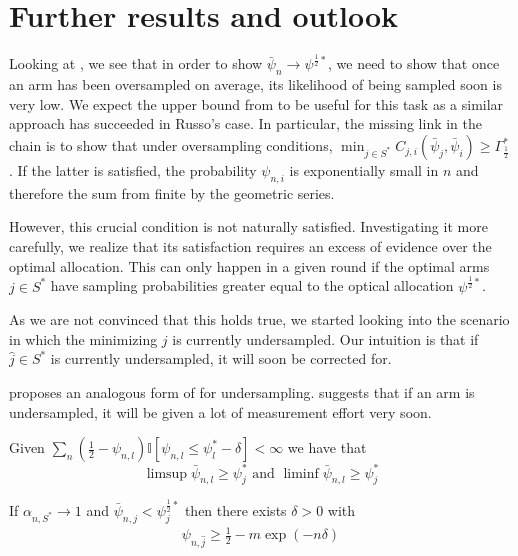 \section{Further results and outlook}

Looking at , we see that in
order to show $\bar{\psi}_n \rightarrow \psi^{\frac{1}{2}*}$, we need to show
that once an arm has been oversampled on average, its likelihood of being
sampled soon is very low. We expect the upper bound from
 to be useful for this task as a similar approach has
succeeded in Russo's case. In particular, the missing link in the chain is to
show that under oversampling conditions, $\min_{j \in S^*} C_{j,
i}(\bar{\psi}_j, \bar{\psi}_i) \geq \Gamma^*_{\frac{1}{2}}$. If the latter is
satisfied, the probability $\psi_{n, i}$ is exponentially small in $n$ and
therefore the sum from  finite
by the geometric series.

However, this crucial condition is not naturally satisfied. Investigating it
more carefully, we realize that its satisfaction requires an excess of evidence
over the optimal allocation. This can only happen in a given round if the
optimal arms $j \in S^*$ have sampling probabilities greater equal to the
optical allocation $\psi^{\frac{1}{2}*}$.

As we are not convinced that this holds true, we started looking into the
scenario in which the minimizing $j$ is currently undersampled. Our intuition is
that if $\hat{j} \in S^*$ is currently undersampled, it will soon be corrected
for.

 proposes an analogous form of
 for undersampling.
 suggests that if an arm is undersampled, it will
be given a lot of measurement effort very soon.
\begin{lemma}\label{lemma:limsup_undersampling}
  Given $\sum_n(\frac{1}{2} - \psi_{n, l}) \mathbb{I}[\psi_{n, l} \leq \psi_l^*
  - \delta] < \infty$ we have that
  \[\limsup \bar{\psi}_{n, l} \geq \psi_j^* \text{ and } \liminf \bar{\psi}_{n, l} \geq \psi_j^*\]
\end{lemma}
\begin{lemma}\label{lemma:psi_undersampled}
  If $\alpha_{n, S^*} \rightarrow 1$ and $\bar{\psi}_{n, j} < \psi^{\frac{1}{2}*}_j$ then there exists $\delta > 0$
  with
  \begin{align}
    \psi_{n, \hat{j}} \geq \frac{1}{2} - m\exp(-n \delta)
  \end{align}
\end{lemma}


